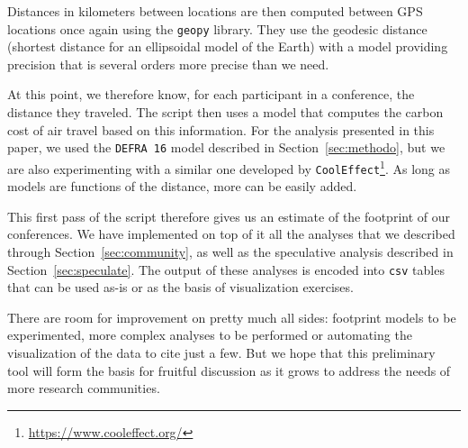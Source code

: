 Distances in kilometers between locations are then computed between GPS
locations once again using the \texttt{geopy} library. They use the geodesic
distance (shortest distance for an ellipsoidal model of the Earth) with a
model providing precision that is several orders more precise than we need.

At this point, we therefore know, for each participant in a conference, the
distance they traveled. The script then uses a model that computes the
carbon cost of air travel based on this information. For the analysis
presented in this paper, we used the \texttt{DEFRA 16} model described in
Section~\ref{sec:methodo}, but we are also experimenting with a similar one
developed by
\texttt{CoolEffect}\footnote{\url{https://www.cooleffect.org/}}.  As long as
models are functions of the distance, more can be easily added.

This first pass of the script therefore gives us an estimate of the
footprint of our conferences. We have implemented on top of it all the
analyses that we described through Section~\ref{sec:community}, as well as
the speculative analysis described in Section~\ref{sec:speculate}. The
output of these analyses is encoded into \texttt{csv} tables that can be
used as-is or as the basis of visualization exercises.

There are room for improvement on pretty much all sides: footprint models to
be experimented, more complex analyses to be performed or automating the
visualization of the data to cite just a few. But we hope that this
preliminary tool will form the basis for fruitful discussion as it grows to
address the needs of more research communities.

